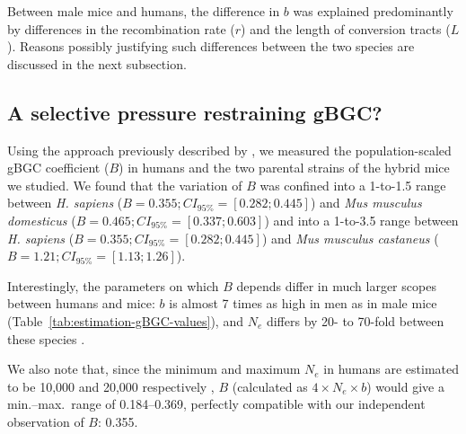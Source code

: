 Between male mice and humans, the difference in $b$ was explained predominantly by differences in the recombination rate ($r$) and the length of conversion tracts ($L$).
Reasons possibly justifying such differences between the two species are discussed in the next subsection.



\subsection{A selective pressure restraining gBGC?}




Using the approach previously described by \citet{glemin2015quantification}, we measured the population-scaled gBGC coefficient ($B$) in humans and the two parental strains of the hybrid mice we studied.
We found that the variation of $B$ was confined into a 1-to-1.5 range between \textit{H. sapiens} ($B = 0.355; CI_{95\%} = [0.282; 0.445]$) and \textit{Mus musculus domesticus} ($B = 0.465; CI_{95\%} = [0.337; 0.603]$) and into a 1-to-3.5 range between \textit{H. sapiens} ($B = 0.355; CI_{95\%} = [0.282; 0.445]$) and \textit{Mus musculus castaneus} ($B = 1.21; CI_{95\%} = [1.13; 1.26]$).

Interestingly, the parameters on which $B$ depends differ in much larger scopes between humans and mice: $b$ is almost 7 times as high in men as in male mice (Table~\ref{tab:estimation-gBGC-values}), and $N_e$ differs by 20- to 70-fold between these species \citep{charlesworth2009fundamental,phifer-rixey2012adaptive}.

We also note that, since the minimum and maximum $N_e$ in humans are estimated to be 10,000 and 20,000 respectively \citep{charlesworth2009fundamental}, $B$ (calculated as ${4 \times N_e \times b}$) would give a min.--max.\ range of 0.184--0.369, perfectly compatible with our independent observation of $B$: 0.355.


